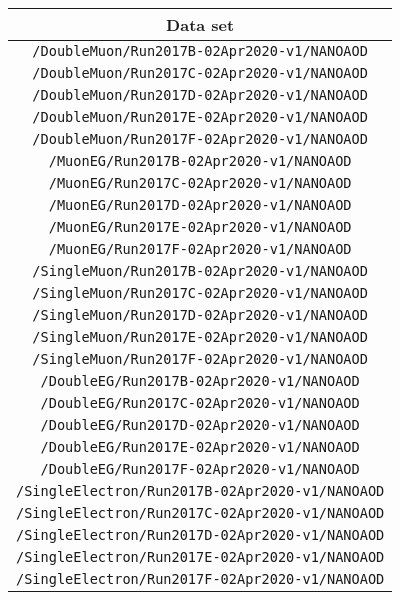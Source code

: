 \begin{table}[!h]
\label{tab:datasets2017}
\begin{center}
{\footnotesize
\begin{tabular}{c}
\hline
Data set  \\
\hline
\texttt{/DoubleMuon/Run2017B-02Apr2020-v1/NANOAOD} \\
\texttt{/DoubleMuon/Run2017C-02Apr2020-v1/NANOAOD} \\
\texttt{/DoubleMuon/Run2017D-02Apr2020-v1/NANOAOD} \\
\texttt{/DoubleMuon/Run2017E-02Apr2020-v1/NANOAOD} \\
\texttt{/DoubleMuon/Run2017F-02Apr2020-v1/NANOAOD} \\
\texttt{/MuonEG/Run2017B-02Apr2020-v1/NANOAOD} \\
\texttt{/MuonEG/Run2017C-02Apr2020-v1/NANOAOD} \\
\texttt{/MuonEG/Run2017D-02Apr2020-v1/NANOAOD} \\
\texttt{/MuonEG/Run2017E-02Apr2020-v1/NANOAOD} \\
\texttt{/MuonEG/Run2017F-02Apr2020-v1/NANOAOD} \\
\texttt{/SingleMuon/Run2017B-02Apr2020-v1/NANOAOD} \\
\texttt{/SingleMuon/Run2017C-02Apr2020-v1/NANOAOD} \\
\texttt{/SingleMuon/Run2017D-02Apr2020-v1/NANOAOD} \\
\texttt{/SingleMuon/Run2017E-02Apr2020-v1/NANOAOD} \\
\texttt{/SingleMuon/Run2017F-02Apr2020-v1/NANOAOD} \\
\texttt{/DoubleEG/Run2017B-02Apr2020-v1/NANOAOD} \\
\texttt{/DoubleEG/Run2017C-02Apr2020-v1/NANOAOD} \\
\texttt{/DoubleEG/Run2017D-02Apr2020-v1/NANOAOD} \\
\texttt{/DoubleEG/Run2017E-02Apr2020-v1/NANOAOD} \\
\texttt{/DoubleEG/Run2017F-02Apr2020-v1/NANOAOD} \\
\texttt{/SingleElectron/Run2017B-02Apr2020-v1/NANOAOD} \\
\texttt{/SingleElectron/Run2017C-02Apr2020-v1/NANOAOD} \\
\texttt{/SingleElectron/Run2017D-02Apr2020-v1/NANOAOD} \\
\texttt{/SingleElectron/Run2017E-02Apr2020-v1/NANOAOD} \\
\texttt{/SingleElectron/Run2017F-02Apr2020-v1/NANOAOD} \\
\hline
\end{tabular}
} %
\end{center}
\end{table}

